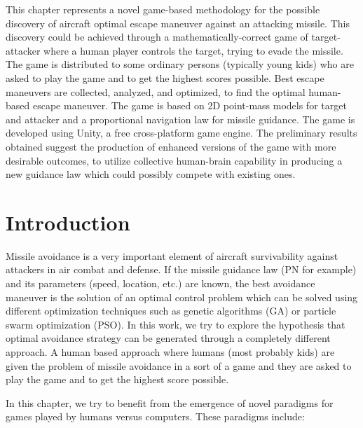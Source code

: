 \label{game}

This chapter represents a novel game-based methodology for the possible discovery of aircraft optimal escape maneuver against an attacking missile. This discovery could be achieved through a mathematically-correct game of target-attacker where a human player controls the target, trying to evade the missile.  The game is distributed to some ordinary persons (typically young kids) who are asked to play the game and to get the highest scores possible. Best escape maneuvers are collected, analyzed, and optimized, to find the optimal human-based escape maneuver. The game is based on 2D point-mass models for target and attacker and a proportional navigation law for missile guidance. The game is developed using Unity, a free cross-platform game engine. The preliminary results obtained suggest the production of enhanced versions of the game with more desirable outcomes, to utilize collective human-brain capability in producing a new guidance law which could possibly compete with existing ones.

\section{Introduction}

Missile avoidance is a very important element of aircraft survivability against attackers in air combat and defense. If the missile guidance law (PN for example) and its parameters (speed, location, etc.) are known, the best avoidance maneuver is the solution of an optimal control problem which can be solved using different optimization techniques such as genetic algorithms (GA) or particle swarm optimization (PSO).  In this work, we try to explore the hypothesis that optimal avoidance strategy can be generated through a completely different approach. A human based approach where humans (most probably kids) are given the problem of missile avoidance in a sort of a game and they are asked to play the game and to get the highest score possible.

In this chapter, we try to benefit from the emergence of novel paradigms for games played by humans versus computers. These paradigms include:


